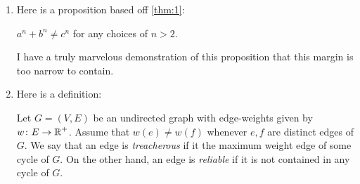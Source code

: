 \documentclass{article}
\begin{document}
\begin{enumerate}
  \item \label{qst:6}
    Here is a proposition based off \autoref{thm:1}:
    \begin{proposition}\label{prop:1}
      $a^n + b^n \neq c^n$ for any choices of $n > 2$.
    \end{proposition}
    \begin{proof*}
      I have a truly marvelous demonstration of this proposition that
      this margin is too narrow to contain.
    \end{proof*}

  \item \label{qst:7}
    Here is a definition:
    \begin{definition}
      Let $G = (V, E)$ be an undirected graph with edge-weights given
      by $w \colon E \rightarrow \operatorname*{\mathbb{R}}^+$. Assume that $w(e) \neq w(f)$
      whenever $e, f$ are distinct edges of $G$. We say that an edge
      is {\it treacherous} if it the maximum weight edge of some cycle
      of $G$. On the other hand, an edge is {\it reliable} if it is not
      contained in any cycle of $G$.
    \end{definition}
\end{enumerate}
\end{document}
